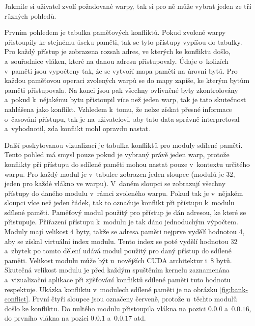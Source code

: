 
Jakmile si uživatel zvolí požadované warpy, tak si pro ně může vybrat jeden ze tří různých pohledů.

Prvním pohledem je tabulka paměťových konfliktů. Pokud zvolené warpy přistoupily ke stejnému úseku paměti, tak se tyto přístupy vypíšou do tabulky. Pro každý přístup je zobrazena rozsah adres, ve kterých ke konfliktu došlo, a~souřadnice vláken, které na danou adresu přistupovaly. Údaje o~kolizích v~paměti jsou vypočteny tak, že se vytvoří mapa paměti na úrovni bytů. Pro každou paměťovou operaci zvolených warpů se do mapy zapíše, ke kterým bytům paměti přistupovala. Na konci jsou pak všechny ovlivněné byty zkontrolovány a~pokud k~nějakému bytu přistoupil více než jeden warp, tak je tato skutečnost nahlášena jako konflikt. Vzhledem k~tomu, že nelze získat přesné informace o~časování přístupu, tak je na uživatelovi, aby tato data správně interpretoval a~vyhodnotil, zda konflikt mohl opravdu nastat.

Další poskytovanou vizualizací je tabulka konfliktů pro moduly sdílené paměti. Tento pohled má smysl pouze pokud je vybraný právě jeden warp, protože konflikty při přístupu do sdílené paměti mohou nastat pouze v~kontextu určitého warpu. Pro každý modul je v~tabulce zobrazen jeden sloupec (modulů je 32, jeden pro každé vlákno ve warpu). V~daném sloupci se zobrazují všechny přístupy do daného modulu v~rámci zvoleného warpu. Pokud tak je v~nějakém sloupci více než jeden řádek, tak to označuje konflikt při přístupu k~modulu sdílené paměti. Paměťový modul použitý pro přístup je dán adresou, ke které se přistupuje. Přiřazení přístupu k~modulu je tak dáno jednoduchým výpočtem. Moduly mají velikost 4 byty, takže se adresa paměti nejprve vydělí hodnotou 4, aby se získal virtuální index modulu. Tento index se poté vydělí hodnotou 32 a~zbytek po tomto dělení udává modul použitý pro daný přístup do sdílené paměti. Velikost modulu může být u~novějších CUDA architektur i~8 bytů. Skutečná velikost modulu je před každým spuštěním kernelu zaznamenána a~vizualizační aplikace při zjišťování konfliktů sdílené paměti tuto hodnotu respektuje. Ukázka konfliktu v~modulech sdílené paměti je na obrázku \ref{fig:bank-conflict}. První čtyři sloupce jsou označeny červeně, protože u~těchto modulů došlo ke konfliktu. Do nultého modulu přistoupila vlákna na pozici $0.0.0$ a~$0.0.16$, do prvního vlákna na pozici $0.0.1$ a~$0.0.17$ atd.


